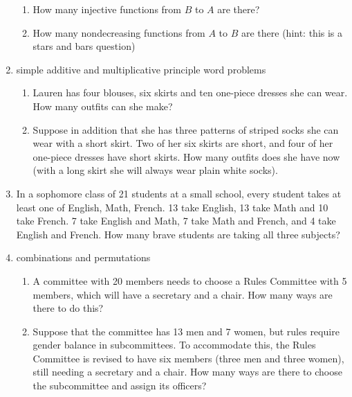 \documentclass[12pt]{article}
\begin{document}
\begin{enumerate}
\begin{enumerate}
\item How many injective functions from $B$ to $A$ are there?

\item How many nondecreasing functions from $A$ to $B$ are there (hint:  this is a stars and bars question)
\end{enumerate}
\newpage

\item  simple additive and multiplicative principle word problems


 

\begin{enumerate}
\item Lauren has four blouses, six skirts and ten one-piece dresses she can wear.  How many outfits can she make?

\item  Suppose in addition that she has three patterns of striped socks she can wear with a short skirt.  Two of her six skirts are short, and four of her one-piece dresses have short skirts.  How many outfits does she have now (with a long skirt she will always wear plain white socks).

\end{enumerate}



\newpage

\item  In a sophomore class of 21 students at a small school, every student takes at least one of English, Math, French.  13 take English, 13 take Math and
10 take French.  7 take English and Math, 7 take Math and French, and 4 take English and French.  How many brave students are taking all three subjects?

\newpage

\item  combinations and permutations

\begin{enumerate}

\item  A committee with 20 members needs to choose a Rules Committee with 5 members, which will have a secretary and a chair.  How many ways are there to do this?

\item  Suppose that the committee has 13 men and 7 women, but rules require gender balance in subcommittees.  To accommodate this, the Rules Committee is revised to have six members (three men and three women), still needing a secretary and a chair.  How many ways are there to choose the subcommittee and assign its officers?


\end{enumerate}
\end{enumerate}
\end{document}
